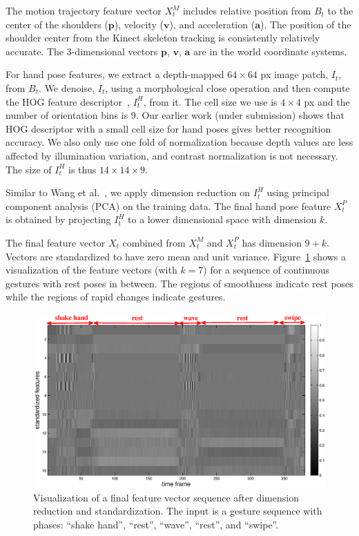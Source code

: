 \documentclass{sigchi}
\begin{document}
The motion trajectory feature vector $X_t^M$ includes relative
position from $B_t$ to the center of the shoulders
($\mathbf{p}$), velocity ($\mathbf{v}$), and acceleration ($\mathbf{a}$). The position of the shoulder center from the Kinect
skeleton tracking is consistently relatively accurate. The 3-dimensional
vectors $\mathbf{p}$, $\mathbf{v}$, $\mathbf{a}$ are in the world coordinate systems.

For hand pose features, we extract a depth-mapped $64\times 64$ px
image patch, $I_t$, from $B_t$.
We denoise, $I_t$, using a morphological close operation and then compute the
HOG feature descriptor~\cite{dalal05}, $I_t^H$, from it. The cell size we use is
$4\times 4$ px and the number of orientation bins is 9. Our earlier work (under
submission) shows that HOG descriptor with a small cell size for hand poses gives better
recognition accuracy. We also only use one fold of normalization because depth
values are less affected by illumination variation, and contrast normalization is
not necessary. The size of $I_t^H$ is thus $14\times 14\times 9$.

Similar to Wang et al.~\cite{wang-spatio-2009}, we apply dimension reduction on
$I_t^H$ using principal component analysis (PCA) on the
training data.
The final hand pose feature $X_t^P$ is obtained by projecting $I_t^H$ to a lower
dimensional space with dimension $k$.

The final feature vector $X_t$ combined from $X_t^M$ and $X_t^P$ has dimension
$9 + k$. Vectors are standardized to have zero mean and unit variance.
Figure~\ref{fig:feature} shows a visualization of the feature vectors (with $k=7$)
for a sequence of continuous gestures with rest poses in between. The regions of
smoothness indicate rest poses while the regions of rapid changes indicate
gestures.

\begin{figure}
\centering
\includegraphics[width=1\columnwidth,trim=20mm 5mm 30mm 1mm,
clip]{figure/pca16.eps}
\caption{Visualization of a final feature vector sequence after dimension reduction and standardization.
The input is a gesture sequence with phases: ``shake hand'', ``rest'', ``wave'', ``rest'', and ``swipe''.}
\label{fig:feature}
\end{figure}
\end{document}
